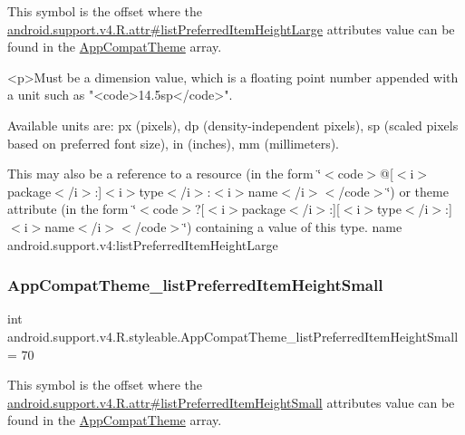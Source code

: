 This symbol is the offset where the \hyperlink{classandroid_1_1support_1_1v4_1_1R_1_1attr_afdf6a597b54d03b67c21dc646bc1e2da}{android.\+support.\+v4.\+R.\+attr\#list\+Preferred\+Item\+Height\+Large} attribute\textquotesingle{}s value can be found in the \hyperlink{classandroid_1_1support_1_1v4_1_1R_1_1styleable_ac07ebbe62ed977f6dcaadc6397840ace}{App\+Compat\+Theme} array.

\begin{DoxyVerb}      <p>Must be a dimension value, which is a floating point number appended with a unit such as "<code>14.5sp</code>".
\end{DoxyVerb}
 Available units are\+: px (pixels), dp (density-\/independent pixels), sp (scaled pixels based on preferred font size), in (inches), mm (millimeters). 

This may also be a reference to a resource (in the form \char`\"{}$<$code$>$@\mbox{[}$<$i$>$package$<$/i$>$\+:\mbox{]}$<$i$>$type$<$/i$>$\+:$<$i$>$name$<$/i$>$$<$/code$>$\char`\"{}) or theme attribute (in the form \char`\"{}$<$code$>$?\mbox{[}$<$i$>$package$<$/i$>$\+:\mbox{]}\mbox{[}$<$i$>$type$<$/i$>$\+:\mbox{]}$<$i$>$name$<$/i$>$$<$/code$>$\char`\"{}) containing a value of this type.  name android.\+support.\+v4\+:list\+Preferred\+Item\+Height\+Large \mbox{\label{classandroid_1_1support_1_1v4_1_1R_1_1styleable_aad0605b48a4d815b0fdc77f1e4dacb4d}} 
\subsubsection{\texorpdfstring{App\+Compat\+Theme\+\_\+list\+Preferred\+Item\+Height\+Small}{AppCompatTheme\_listPreferredItemHeightSmall}}
{\footnotesize\ttfamily int android.\+support.\+v4.\+R.\+styleable.\+App\+Compat\+Theme\+\_\+list\+Preferred\+Item\+Height\+Small = 70\hspace{0.3cm}{\ttfamily [static]}}

This symbol is the offset where the \hyperlink{classandroid_1_1support_1_1v4_1_1R_1_1attr_a58ffbc1e4aa9d5fc75bba3f966c39df2}{android.\+support.\+v4.\+R.\+attr\#list\+Preferred\+Item\+Height\+Small} attribute\textquotesingle{}s value can be found in the \hyperlink{classandroid_1_1support_1_1v4_1_1R_1_1styleable_ac07ebbe62ed977f6dcaadc6397840ace}{App\+Compat\+Theme} array.


